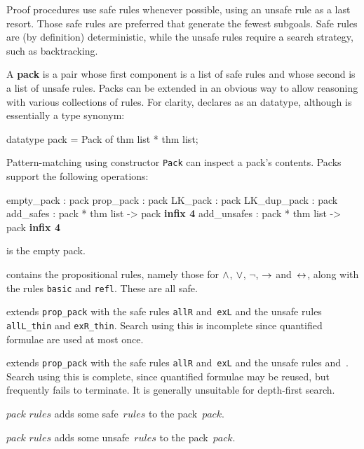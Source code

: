 Proof procedures use safe rules whenever possible, using an unsafe rule as a
last resort.  Those safe rules are preferred that generate the fewest
subgoals.  Safe rules are (by definition) deterministic, while the unsafe
rules require a search strategy, such as backtracking.

A {\bf pack} is a pair whose first component is a list of safe rules and
whose second is a list of unsafe rules.  Packs can be extended in an
obvious way to allow reasoning with various collections of rules.  For
clarity, \LK{} declares  as an \ML{} datatype, although is
essentially a type synonym:
\begin{ttbox}
datatype pack = Pack of thm list * thm list;
\end{ttbox}
Pattern-matching using constructor {\tt Pack} can inspect a pack's
contents.  Packs support the following operations:
\begin{ttbox} 
empty_pack  : pack
prop_pack   : pack
LK_pack     : pack
LK_dup_pack : pack
add_safes   : pack * thm list -> pack               \hfill{\bf infix 4}
add_unsafes : pack * thm list -> pack               \hfill{\bf infix 4}
\end{ttbox}
\begin{ttdescription}
\item[\ttindexbold{empty_pack}] is the empty pack.

\item[\ttindexbold{prop_pack}] contains the propositional rules, namely
those for $\wedge$, $\vee$, $\neg$, $\rightarrow$ and~$\leftrightarrow$, along with the
rules {\tt basic} and {\tt refl}.  These are all safe.

\item[\ttindexbold{LK_pack}] 
extends {\tt prop_pack} with the safe rules {\tt allR}
and~{\tt exL} and the unsafe rules {\tt allL_thin} and
{\tt exR_thin}.  Search using this is incomplete since quantified
formulae are used at most once.

\item[\ttindexbold{LK_dup_pack}] 
extends {\tt prop_pack} with the safe rules {\tt allR}
and~{\tt exL} and the unsafe rules  and~.
Search using this is complete, since quantified formulae may be reused, but
frequently fails to terminate.  It is generally unsuitable for depth-first
search.

\item[$pack$ \ttindexbold{add_safes} $rules$] 
adds some safe~$rules$ to the pack~$pack$.

\item[$pack$ \ttindexbold{add_unsafes} $rules$] 
adds some unsafe~$rules$ to the pack~$pack$.
\end{ttdescription}


